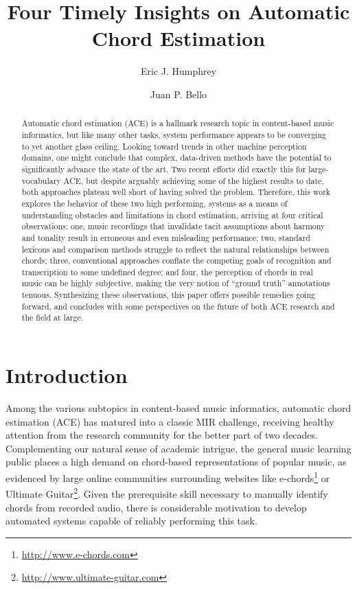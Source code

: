 \documentclass{article}
\title{Four Timely Insights on Automatic Chord Estimation}
\author[1,2]{Eric J. Humphrey}
\author[1]{Juan P. Bello}
\affil[1]{Music and Audio Research Laboratory, New York University}
\affil[2]{MuseAmi, Inc.}
\begin{document}
%
\maketitle
\sloppy
%

\let\oldthefootnote\thefootnote%
\renewcommand{\thefootnote}{\fnsymbol{footnote}}
\let\thefootnote\oldthefootnote%

\begin{abstract}

Automatic chord estimation (ACE) is a hallmark research topic in content-based music informatics, but like many other tasks, system performance appears to be converging to yet another glass ceiling.
Looking toward trends in other machine perception domains, one might conclude that complex, data-driven methods have the potential to significantly advance the state of the art.
Two recent efforts did exactly this for large-vocabulary ACE, but despite arguably achieving some of the highest results to date, both approaches plateau well short of having solved the problem.
Therefore, this work explores the behavior of these two high performing,  systems as a means of understanding obstacles and limitations in chord estimation, arriving at four critical observations:
one, music recordings that invalidate tacit assumptions about harmony and tonality result in erroneous and even misleading performance;
two, standard lexicons and comparison methods struggle to reflect the natural relationships between chords;
three, conventional approaches conflate the competing goals of recognition and transcription to some undefined degree;
and four, the perception of chords in real music can be highly subjective, making the very notion of ``ground truth'' annotations tenuous.
Synthesizing these observations, this paper offers possible remedies going forward, and concludes with some perspectives on the future of both ACE research and the field at large.

\end{abstract}


\section{Introduction}
\label{sec:introduction}

Among the various subtopics in content-based music informatics, automatic chord estimation (ACE) has matured into a classic MIR challenge, receiving healthy attention from the research community for the better part of two decades.
Complementing our natural sense of academic intrigue, the general music learning public places a high demand on chord-based representations of popular music, as evidenced by large online communities surrounding websites like e-chords\footnote{\url{http://www.e-chords.com}} or Ultimate Guitar\footnote{\url{http://www.ultimate-guitar.com}}.
Given the prerequisite skill necessary to manually identify chords from recorded audio, there is considerable motivation to develop automated systems capable of reliably performing this task.
\end{document}
